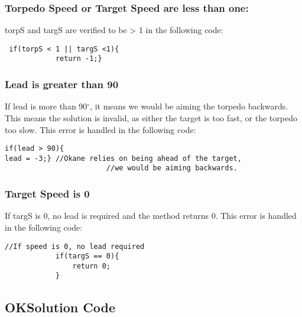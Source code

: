 \documentclass{article}
\newcommand{\degree}{$^{\circ}$}
\begin{document}
\subsubsection{Torpedo Speed or Target Speed are less than one:}
torpS and targS are verified to be > 1 in the following code:
\begin{lstlisting}
 if(torpS < 1 || targS <1){
            return -1;}
\end{lstlisting}

\subsubsection{Lead is greater than 90}
If lead is more than 90\degree , it means we would be aiming the torpedo backwards. This means the solution is invalid, as either the target is too fast, or the torpedo too slow. This error is handled in the following code:

\begin{lstlisting}
if(lead > 90){
lead = -3;} //Okane relies on being ahead of the target,
						//we would be aiming backwards.
\end{lstlisting}

\subsubsection{Target Speed is 0}
If targS is 0, no lead is required and the method returns 0.
This error is handled in the following code:

\begin{lstlisting}
//If speed is 0, no lead required
            if(targS == 0){
            	return 0;
            }
\end{lstlisting}

\subsection{OKSolution Code}
\end{document}

